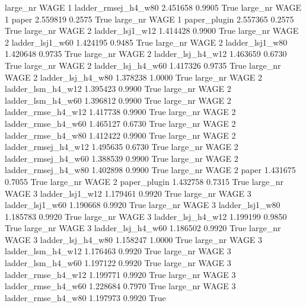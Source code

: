   large_nr     WAGE                 1 ladder_rmsej_h4_w80   2.451658      0.9905    True
  large_nr     WAGE                 1               paper   2.559819      0.2575    True
  large_nr     WAGE                 1        paper_plugin   2.557365      0.2575    True
  large_nr     WAGE                 2     ladder_lsj1_w12   1.414428      0.9900    True
  large_nr     WAGE                 2     ladder_lsj1_w60   1.424195      0.9485    True
  large_nr     WAGE                 2     ladder_lsj1_w80   1.420648      0.9735    True
  large_nr     WAGE                 2   ladder_lsj_h4_w12   1.463659      0.6730    True
  large_nr     WAGE                 2   ladder_lsj_h4_w60   1.417326      0.9735    True
  large_nr     WAGE                 2   ladder_lsj_h4_w80   1.378238      1.0000    True
  large_nr     WAGE                 2   ladder_lsm_h4_w12   1.395423      0.9900    True
  large_nr     WAGE                 2   ladder_lsm_h4_w60   1.396812      0.9900    True
  large_nr     WAGE                 2  ladder_rmse_h4_w12   1.417738      0.9900    True
  large_nr     WAGE                 2  ladder_rmse_h4_w60   1.465127      0.6730    True
  large_nr     WAGE                 2  ladder_rmse_h4_w80   1.412422      0.9900    True
  large_nr     WAGE                 2 ladder_rmsej_h4_w12   1.495635      0.6730    True
  large_nr     WAGE                 2 ladder_rmsej_h4_w60   1.388539      0.9900    True
  large_nr     WAGE                 2 ladder_rmsej_h4_w80   1.402898      0.9900    True
  large_nr     WAGE                 2               paper   1.431675      0.7055    True
  large_nr     WAGE                 2        paper_plugin   1.432758      0.7315    True
  large_nr     WAGE                 3     ladder_lsj1_w12   1.179461      0.9920    True
  large_nr     WAGE                 3     ladder_lsj1_w60   1.190668      0.9920    True
  large_nr     WAGE                 3     ladder_lsj1_w80   1.185783      0.9920    True
  large_nr     WAGE                 3   ladder_lsj_h4_w12   1.199199      0.9850    True
  large_nr     WAGE                 3   ladder_lsj_h4_w60   1.186502      0.9920    True
  large_nr     WAGE                 3   ladder_lsj_h4_w80   1.158247      1.0000    True
  large_nr     WAGE                 3   ladder_lsm_h4_w12   1.176463      0.9920    True
  large_nr     WAGE                 3   ladder_lsm_h4_w60   1.197122      0.9920    True
  large_nr     WAGE                 3  ladder_rmse_h4_w12   1.199771      0.9920    True
  large_nr     WAGE                 3  ladder_rmse_h4_w60   1.228684      0.7970    True
  large_nr     WAGE                 3  ladder_rmse_h4_w80   1.197973      0.9920    True
